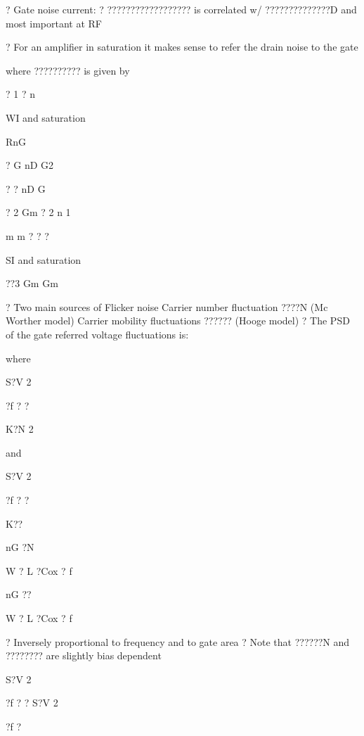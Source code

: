 \documentclass[2pt,landscape]{article}
\begin{document}
\begin{multicols*}{5}
?	Gate noise current:
?	??????????????????   is correlated w/ ??????????????D and most important at RF





?	For an amplifier in saturation it makes sense to refer the drain noise to 
the gate










where ??????????  is given by


?	1 ? n 



WI and saturation


RnG


? G	nD
G2


? ? nD
G


?	2 Gm
? 2	n	1


m	m	?  ?	?



SI and saturation



??3  Gm	Gm



?	Two main sources of Flicker noise
\textbullet 	Carrier number fluctuation ????N (Mc Worther model)
\textbullet 	Carrier mobility fluctuations ?????? (Hooge model)
?	The PSD of the gate referred voltage fluctuations is:




where


S?V 2


?f ?	?


K?N
2


and


S?V 2


?f ?	?


K??




nG	?N


W ? L ?Cox ? f


nG	??


W ? L ?Cox ? f




?	Inversely proportional to frequency and to gate area
?	Note that ??????N  and ????????  are slightly bias dependent





S?V 2


?f ? ? S?V 2


?f ?



\end{multicols*}
\end{document}

